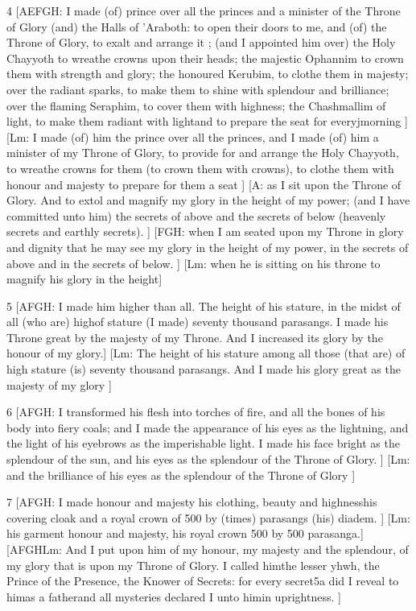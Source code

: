 \par 4 [AEFGH: I made (of) prince over all the princes and a minister of the Throne of Glory (and) the Halls of 'Araboth: to open their doors to me, and (of) the Throne of Glory, to exalt and arrange it ; (and I appointed him over) the Holy Chayyoth to wreathe crowns upon their heads; the majestic Ophannim to crown them with strength and glory; the honoured Kerubim, to clothe them in majesty; over the radiant sparks, to make them to shine with splendour and brilliance; over the flaming Seraphim, to cover them with highness; the Chashmallim of light, to make them radiant with lightand to prepare the seat for everyjmorning ] [Lm: I made (of) him the prince over all the princes, and I made (of) him a minister of my Throne of Glory, to provide for and arrange the Holy Chayyoth, to wreathe crowns for them (to crown them with crowns), to clothe them with honour and majesty to prepare for them a seat ] [A: as I sit upon the Throne of Glory. And to extol and magnify my glory in the height of my power; (and I have committed unto him) the secrets of above and the secrets of below (heavenly secrets and earthly secrets). ] [FGH: when I am seated upon my Throne in glory and dignity that he may see my glory in the height of my power, in the secrets of above and in the secrets of below. ] [Lm: when he is sitting on his throne to magnify his glory in the height]

\par 5 [AFGH: I made him higher than all. The height of his stature, in the midst of all (who are) highof stature (I made) seventy thousand parasangs. I made his Throne great by the majesty of my Throne. And I increased its glory by the honour of my glory.] [Lm: The height of his stature among all those (that are) of high stature (is) seventy thousand parasangs. And I made his glory great as the majesty of my glory ]

\par 6 [AFGH: I transformed his flesh into torches of fire, and all the bones of his body into fiery coals; and I made the appearance of his eyes as the lightning, and the light of his eyebrows as the imperishable light. I made his face bright as the splendour of the sun, and his eyes as the splendour of the Throne of Glory. ] [Lm: and the brilliance of his eyes as the splendour of the Throne of Glory ]

\par 7 [AFGH: I made honour and majesty his clothing, beauty and highnesshis covering cloak and a royal crown of 500 by (times) parasangs (his) diadem. ] [Lm: his garment honour and majesty, his royal crown 500 by 500 parasanga.] [AFGHLm: And I put upon him of my honour, my majesty and the splendour, of my glory that is upon my Throne of Glory. I called himthe lesser yhwh, the Prince of the Presence, the Knower of Secrets: for every secret5a did I reveal to himas a fatherand all mysteries declared I unto himin uprightness. ]

